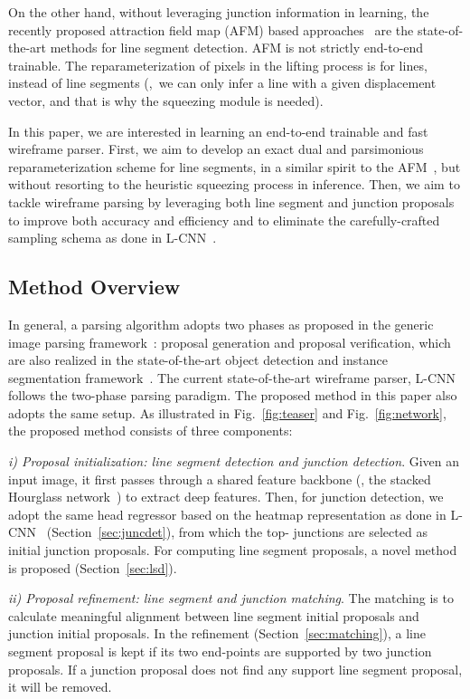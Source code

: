 \documentclass[10pt,twocolumn,letterpaper]{article}
\begin{document}
On the other hand, without leveraging junction information in learning, the recently proposed attraction field map (AFM) based approaches~\cite{afm,afm-pami} are the state-of-the-art methods for line segment detection. 
AFM is not strictly end-to-end trainable. The reparameterization of pixels in the lifting process is for lines, instead of line segments (\ie,~we can only infer a line with a given displacement vector, and that is why the squeezing module is needed). 

In this paper, we are interested in learning an end-to-end trainable and fast wireframe parser. First, we aim to develop an exact dual and parsimonious reparameterization scheme for line segments, in a similar spirit to the AFM~\cite{afm}, but without resorting to the heuristic squeezing process in inference. Then, we aim to tackle wireframe parsing by leveraging both line segment and junction proposals to improve both accuracy and efficiency and to eliminate the carefully-crafted sampling schema as done in L-CNN~\cite{ZhouQM19}. 

\subsection{Method Overview}
\vspace{-2mm}
In general, a parsing algorithm adopts two phases as proposed in the generic image parsing framework~\cite{TuParsing}: proposal generation and proposal verification, which are also realized in the state-of-the-art object detection and instance segmentation framework~\cite{fastRCNN,fasterrcnn,maskrcnn}. 
The current state-of-the-art wireframe parser, L-CNN~\cite{ZhouQM19} follows the two-phase parsing paradigm. The proposed method in this paper also adopts the same setup. As illustrated in Fig.~\ref{fig:teaser} and Fig.~\ref{fig:network}, the proposed method consists of three components: 

\textit{i) Proposal initialization: line segment detection and junction detection}. Given an input image, it first passes through a shared feature backbone (\eg, the stacked Hourglass network~\cite{NewellYD16}) to extract deep features. Then, for junction detection, we adopt the same head regressor based on the heatmap representation as done in L-CNN~\cite{ZhouQM19} (Section~\ref{sec:juncdet}), from which the top- junctions are selected as initial junction proposals. For computing line segment proposals, a novel method is proposed (Section~\ref{sec:lsd}).


\textit{ii) Proposal refinement: line segment  and junction matching}. The matching is to calculate meaningful alignment between line segment initial proposals and junction initial proposals. In the refinement (Section~\ref{sec:matching}), a line segment proposal is kept if its two end-points are supported by two junction proposals. If a junction proposal does not find any support line segment proposal, it will be removed. 
\end{document}
